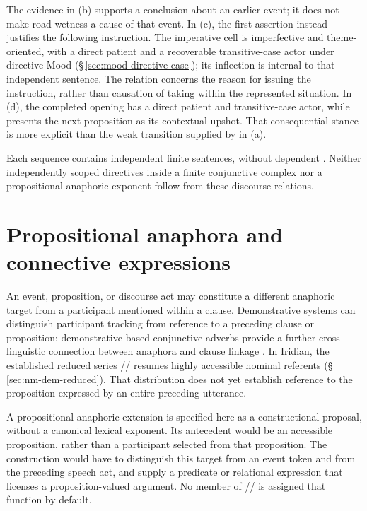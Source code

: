 The evidence in (b) supports a conclusion about an earlier event; it
does not make road wetness a cause of that event. In (c), the first assertion
instead justifies the following instruction. The imperative cell is imperfective and theme-oriented, with a direct
patient and a recoverable transitive-case actor under directive Mood
(§\,\ref{sec:mood-directive-case}); its inflection is internal to that
independent sentence. The relation concerns
the reason for issuing the instruction, rather than causation of taking
within the represented situation. In (d), the completed opening has a direct
patient and transitive-case actor, while  presents the next
proposition as its contextual upshot. That consequential stance is more
explicit than the weak transition supplied by  in (a).

Each sequence contains independent finite sentences, without dependent
. Neither independently scoped directives inside a finite
conjunctive complex nor a propositional-anaphoric exponent follow from these
discourse relations.

\section{Propositional anaphora and connective expressions}
\label{sec:propositional-anaphora}

An event, proposition, or discourse act may constitute a different anaphoric
target from a participant mentioned within a clause. Demonstrative systems
can distinguish participant tracking from reference to a preceding clause or
proposition; demonstrative-based conjunctive adverbs provide a further
cross-linguistic connection between anaphora and clause linkage
\cite[306,321--325]{diesselbreunesse2020}. In Iridian, the established reduced
series // resumes highly accessible nominal referents
(§\,\ref{sec:nm-dem-reduced}). That distribution does not yet establish
reference to the proposition expressed by an entire preceding utterance.

A propositional-anaphoric extension is specified here as a constructional
proposal, without a canonical lexical exponent. Its antecedent would be an
accessible proposition, rather than a participant selected from that
proposition. The construction would have to distinguish this target from an
event token and from the preceding speech act, and supply a predicate or
relational expression that licenses a proposition-valued argument. No
member of // is assigned that function by default.

